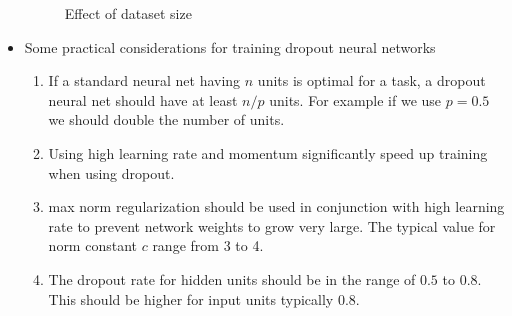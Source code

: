 \documentclass{article}
\begin{document}
\begin{itemize}
\begin{figure}[H]
        \caption{Effect of dataset size}
        \label{fig:Figure 3}
    \end{figure}
    \item Some practical considerations for training dropout neural networks
    \begin{enumerate}
        \item If a standard neural net having $n$ units is optimal for a task, a dropout neural net should have at least $n/p$ units. For example if we use $p=0.5$ we should double the number of units.
        \item Using high learning rate and momentum significantly speed up training when using dropout.
        \item max norm regularization should be used in conjunction with high learning rate to prevent network weights to grow very large. The typical value for norm constant $c$ range from 3 to 4.
        \item The dropout rate for hidden units should be in the range of $0.5$ to $0.8$. This should be higher for input units typically 0.8.
    \end{enumerate}

\end{itemize}
\end{document}
